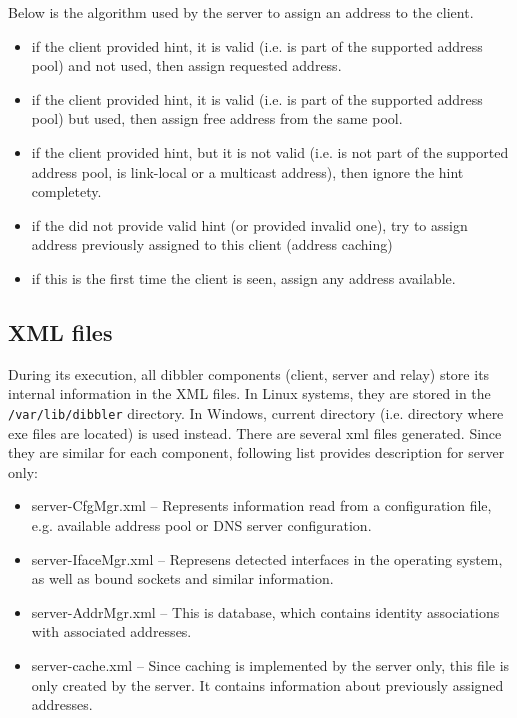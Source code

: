 \begin{enumerate}
Below is the algorithm used by the server to assign an address to the client.

\begin{itemize}
 \item if the client provided hint, it is valid (i.e. is part of the
       supported address pool) and not used, then assign requested address.
 \item if the client provided hint, it is valid (i.e. is part of the
       supported address pool) but used, then assign free address from
       the same pool.
 \item if the client provided hint, but it is not valid (i.e. is not
       part of the supported address pool, is link-local or a multicast
       address), then ignore the hint completety.
 \item if the did not provide valid hint (or provided invalid one), try
       to assign address previously assigned to this client (address caching)
 \item if this is the first time the client is seen, assign any address
       available.
\end{itemize}


\subsection{XML files}
\label{feature-xml}
During its execution, all dibbler components (client, server and
relay) store its internal information in the XML files. In Linux
systems, they are stored in the \verb+/var/lib/dibbler+ directory. In
Windows, current directory (i.e. directory where exe files are
located) is used instead. There are several xml files generated. Since
they are similar for each component, following list provides
description for server only:

\begin{itemize}
\item server-CfgMgr.xml -- Represents information read from a
  configuration file, e.g. available address pool or DNS server
      configuration.
\item server-IfaceMgr.xml -- Represens detected interfaces in the
  operating system, as well as bound sockets and similar information.
\item server-AddrMgr.xml -- This is database, which contains identity
  associations with associated addresses.
 \item server-cache.xml -- Since caching is implemented by the server
      only, this file is only created by the server. It contains
      information about previously assigned addresses.
\end{itemize}



\end{enumerate}
